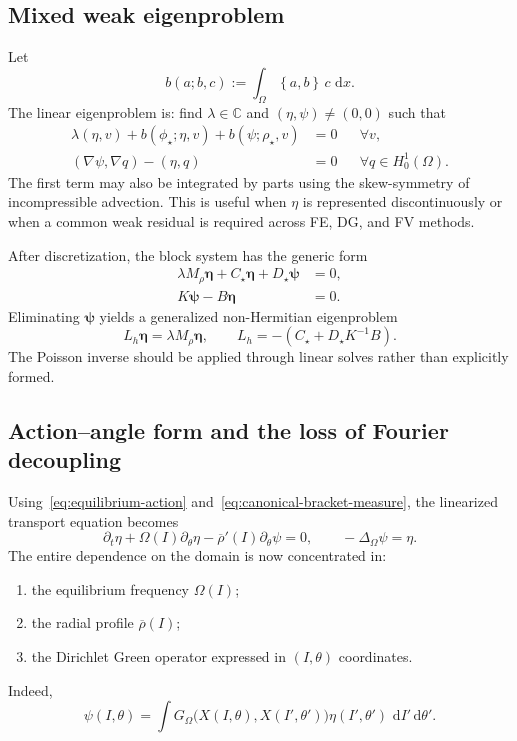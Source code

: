\documentclass[11pt,a4paper]{article}
\newcommand{\C}{\mathbb{C}}
\newcommand{\Om}{\Omega}
\newcommand{\dd}{\,\mathrm{d}}
\newcommand{\bracket}[2]{\left\{#1,#2\right\}}
\begin{document}
\subsection{Mixed weak eigenproblem}

Let
\[
  b(a;b,c):=\int_\Om\bracket{a}{b}\,c\,\dd x.
\]
The linear eigenproblem is: find $\lambda\in\C$ and $(\eta,\psi)\neq(0,0)$ such that
\begin{align}
  \lambda(\eta,v)
  +b(\phi_\star;\eta,v)
  +b(\psi;\rho_\star,v)&=0
  &&\forall v, \label{eq:weak-eigen-transport}\\
  (\nabla\psi,\nabla q)-(\eta,q)&=0
  &&\forall q\in H_0^1(\Om). \label{eq:weak-eigen-poisson}
\end{align}
The first term may also be integrated by parts using the skew-symmetry of incompressible advection. This is useful when $\eta$ is represented discontinuously or when a common weak residual is required across FE, DG, and FV methods.

After discretization, the block system has the generic form
\begin{align}
  \lambda M_\rho\boldsymbol\eta
  +C_\star\boldsymbol\eta
  +D_\star\boldsymbol\psi&=0, \label{eq:block1}\\
  K\boldsymbol\psi-B\boldsymbol\eta&=0. \label{eq:block2}
\end{align}
Eliminating $\boldsymbol\psi$ yields a generalized non-Hermitian eigenproblem
\begin{equation}
  L_h\boldsymbol\eta
  =\lambda M_\rho\boldsymbol\eta,
  \qquad
  L_h=-\left(C_\star+D_\star K^{-1}B\right).
  \label{eq:discrete-eigenproblem}
\end{equation}
The Poisson inverse should be applied through linear solves rather than explicitly formed.

\subsection{Action--angle form and the loss of Fourier decoupling}

Using~\eqref{eq:equilibrium-action} and~\eqref{eq:canonical-bracket-measure}, the linearized transport equation becomes
\begin{equation}
  \partial_t\eta
  +\Omega(I)\partial_\theta\eta
  -\overline\rho'(I)\partial_\theta\psi
  =0,
  \qquad
  -\Delta_\Om\psi=\eta.
  \label{eq:linear-action-angle}
\end{equation}
The entire dependence on the domain is now concentrated in:
\begin{enumerate}[label=(\roman*)]
  \item the equilibrium frequency $\Omega(I)$;
  \item the radial profile $\overline\rho(I)$;
  \item the Dirichlet Green operator expressed in $(I,\theta)$ coordinates.
\end{enumerate}
Indeed,
\begin{equation}
  \psi(I,\theta)
  =\int
  G_\Om\bigl(X(I,\theta),X(I',\theta')\bigr)
  \eta(I',\theta')\,
  \dd I'\dd\theta'.
  \label{eq:green-action-angle}
\end{equation}
\end{document}
